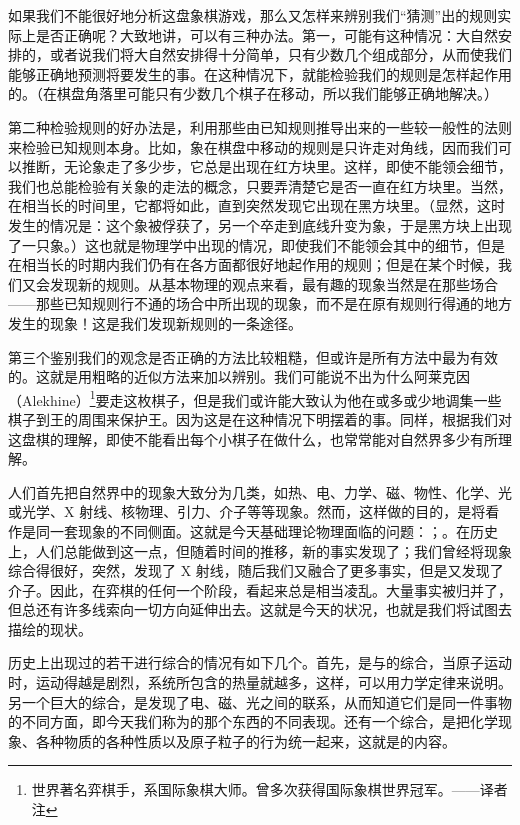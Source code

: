 如果我们不能很好地分析这盘象棋游戏，那么又怎样来辨别我们“猜测”出的规则实际上是否正确呢？大致地讲，可以有三种办法。第一，可能有这种情况：大自然安排的，或者说我们将大自然安排得十分简单，只有少数几个组成部分，从而使我们能够正确地预测将要发生的事。在这种情况下，就能检验我们的规则是怎样起作用的。（在棋盘角落里可能只有少数几个棋子在移动，所以我们能够正确地解决。）

第二种检验规则的好办法是，利用那些由已知规则推导出来的一些较一般性的法则来检验已知规则本身。比如，象在棋盘中移动的规则是只许走对角线，因而我们可以推断，无论象走了多少步，它总是出现在红方块里。这样，即使不能领会细节，我们也总能检验有关象的走法的概念，只要弄清楚它是否一直在红方块里。当然，在相当长的时间里，它都将如此，直到突然发现它出现在黑方块里。（显然，这时发生的情况是：这个象被俘获了，另一个卒走到底线升变为象，于是黑方块上出现了一只象。）这也就是物理学中出现的情况，即使我们不能领会其中的细节，但是在相当长的时期内我们仍有在各方面都很好地起作用的规则；但是在某个时候，我们又会发现新的规则。从基本物理的观点来看，最有趣的现象当然是在那些场合——那些已知规则行不通的场合中所出现的现象，而不是在原有规则行得通的地方发生的现象！这是我们发现新规则的一条途径。

第三个鉴别我们的观念是否正确的方法比较粗糙，但或许是所有方法中最为有效的。这就是用粗略的近似方法来加以辨别。我们可能说不出为什么阿莱克因（Alekhine）\footnote{世界著名弈棋手，系国际象棋大师。曾多次获得国际象棋世界冠军。——译者注}要走这枚棋子，但是我们或许能大致认为他在或多或少地调集一些棋子到王的周围来保护王。因为这是在这种情况下明摆着的事。同样，根据我们对这盘棋的理解，即使不能看出每个小棋子在做什么，也常常能对自然界多少有所理解。

人们首先把自然界中的现象大致分为几类，如热、电、力学、磁、物性、化学、光或光学、X 射线、核物理、引力、介子等等现象。然而，这样做的目的，是将看作是同一套现象的不同侧面。这就是今天基础理论物理面临的问题：；。在历史上，人们总能做到这一点，但随着时间的推移，新的事实发现了；我们曾经将现象综合得很好，突然，发现了 X 射线，随后我们又融合了更多事实，但是又发现了介子。因此，在弈棋的任何一个阶段，看起来总是相当凌乱。大量事实被归并了，但总还有许多线索向一切方向延伸出去。这就是今天的状况，也就是我们将试图去描绘的现状。

历史上出现过的若干进行综合的情况有如下几个。首先，是与的综合，当原子运动时，运动得越是剧烈，系统所包含的热量就越多，这样，可以用力学定律来说明。另一个巨大的综合，是发现了电、磁、光之间的联系，从而知道它们是同一件事物的不同方面，即今天我们称为的那个东西的不同表现。还有一个综合，是把化学现象、各种物质的各种性质以及原子粒子的行为统一起来，这就是的内容。

